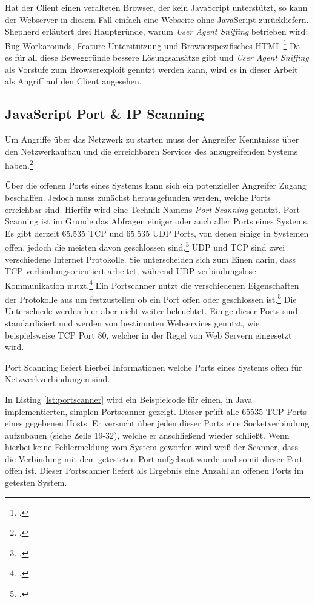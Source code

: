 Hat der Client einen veralteten Browser, der kein JavaScript unterstützt, so kann der
Webserver in diesem Fall einfach eine Webseite ohne JavaScript zurückliefern.
Shepherd erläutert drei Hauptgründe, warum \textit{User Agent Sniffing}
betrieben wird: Bug-Workarounds, Feature-Unterstützung und Browserspezifisches
HTML.\footcite[Vgl.][]{mdnBrowserDetection} Da es für all diese Beweggründe bessere Lösungsansätze
gibt und \textit{User Agent Sniffing} als Vorstufe zum Browserexploit genutzt werden kann, wird es
in dieser Arbeit als Angriff auf den Client angesehen.


\subsection{JavaScript Port \& IP Scanning}
Um Angriffe über das Netzwerk zu starten muss der Angreifer Kenntnisse über den Netzwerkaufbau und
die erreichbaren Services des anzugreifenden Systems haben.\footcite[Vgl.][937]{port1}

Über die offenen Ports eines Systems kann sich ein potenzieller Angreifer Zugang beschaffen. Jedoch
muss zunächst herausgefunden werden, welche Ports erreichbar sind. Hierfür wird eine Technik Namens
\textit{Port Scanning} genutzt. Port Scanning ist im Grunde das Abfragen einiger oder auch aller
Ports eines Systems. Es gibt derzeit 65.535 TCP und 65.535 UDP Ports, von denen einige in
Systemen offen, jedoch die meisten davon geschlossen sind.\footcite[Vgl.][937]{port1} UDP und TCP
sind zwei verschiedene Internet Protokolle. Sie unterscheiden sich zum Einen darin, dass TCP
verbindungsorientiert arbeitet, während UDP verbindungslose Kommunikation
nutzt.\footcite[Vgl.][]{tcpudp} Ein Portscanner nutzt die verschiedenen Eigenschaften der
Protokolle aus um festzustellen ob ein Port offen oder geschlossen ist.\footcite[Vgl.][31]{port2}
Die Unterschiede werden hier aber nicht weiter beleuchtet. Einige dieser Ports sind standardisiert
und werden von bestimmten Webservices genutzt, wie beispielsweise TCP Port 80, welcher in der Regel
von Web Servern eingesetzt wird.

Port Scanning liefert hierbei Informationen welche Ports eines Systems offen für Netzwerkverbindungen sind.

In Listing \ref{lst:portscanner} wird ein Beispielcode für einen, in Java implementierten, simplen Portscanner gezeigt. Dieser prüft alle 65535 TCP Ports eines gegebenen Hosts. Er versucht über jeden dieser Ports eine Socketverbindung aufzubauen (siehe Zeile 19-32), welche er anschließend wieder schließt. Wenn hierbei keine Fehlermeldung vom System geworfen wird weiß der Scanner, dass die Verbindung mit dem getesteten Port aufgebaut wurde und somit dieser Port offen ist. Dieser Portscanner liefert als Ergebnis eine Anzahl an offenen Ports im getesten System.

